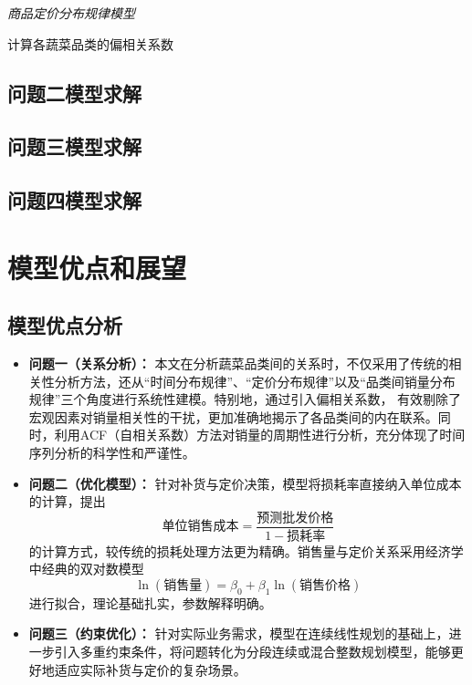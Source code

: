 \documentclass{article}
\begin{document}
\textit{商品定价分布规律模型}

计算各蔬菜品类的偏相关系数
\subsection{问题二模型求解}

\subsection{问题三模型求解}

\subsection{问题四模型求解}



\section{模型优点和展望}
\subsection{模型优点分析}
\begin{itemize}
    \item \textbf{问题一（关系分析）：} 本文在分析蔬菜品类间的关系时，不仅采用了传统的相关性分析方法，还从“时间分布规律”、“定价分布规律”以及“品类间销量分布规律”三个角度进行系统性建模。特别地，通过引入偏相关系数，
    有效剔除了宏观因素对销量相关性的干扰，更加准确地揭示了各品类间的内在联系。同时，利用ACF（自相关系数）方法对销量的周期性进行分析，充分体现了时间序列分析的科学性和严谨性。

    \item \textbf{问题二（优化模型）：} 针对补货与定价决策，模型将损耗率直接纳入单位成本的计算，提出
    \[
    \text{单位销售成本} = \frac{\text{预测批发价格}}{1 - \text{损耗率}}
    \]
    的计算方式，较传统的损耗处理方法更为精确。销售量与定价关系采用经济学中经典的双对数模型
    \[
    \ln(\text{销售量}) = \beta_0 + \beta_1 \ln(\text{销售价格})
    \]
    进行拟合，理论基础扎实，参数解释明确。

    \item \textbf{问题三（约束优化）：} 针对实际业务需求，模型在连续线性规划的基础上，进一步引入多重约束条件，将问题转化为分段连续或混合整数规划模型，能够更好地适应实际补货与定价的复杂场景。
\end{itemize}
\newpage
\end{document}

